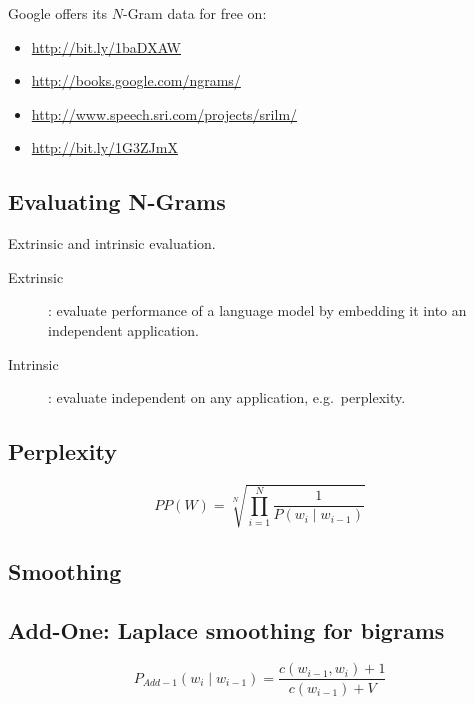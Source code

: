Google offers its $N$-Gram data for free on:

\begin{itemize}
  \item \url{http://bit.ly/1baDXAW} %
  \item \url{http://books.google.com/ngrams/}
  \item	\url{http://www.speech.sri.com/projects/srilm/}
  \item	\url{http://bit.ly/1G3ZJmX} %
\end{itemize}


\subsection*{Evaluating N-Grams}

Extrinsic and intrinsic evaluation.

\begin{description}
  \item [Extrinsic]: evaluate performance of a language model by embedding it into an independent application.
  \item [Intrinsic]: evaluate independent on any application, e.g.\ perplexity.
\end{description}


\subsection*{Perplexity}

\begin{equation}
  PP(W) = \sqrt[N]{\prod_{i=1}^{N}\frac{1}{P(w_i \mid w_{i-1})}}
  \label{eq:ppw}
\end{equation}


\subsection*{Smoothing}


\subsection*{Add-One: Laplace smoothing for bigrams}

\begin{equation}
  P_{Add-1}(w_i \mid w_{i-1}) = \frac{c(w_{i-1}, w_i) + 1}{c(w_{i-1}) + V}
  \label{eq:padd1}
\end{equation}


